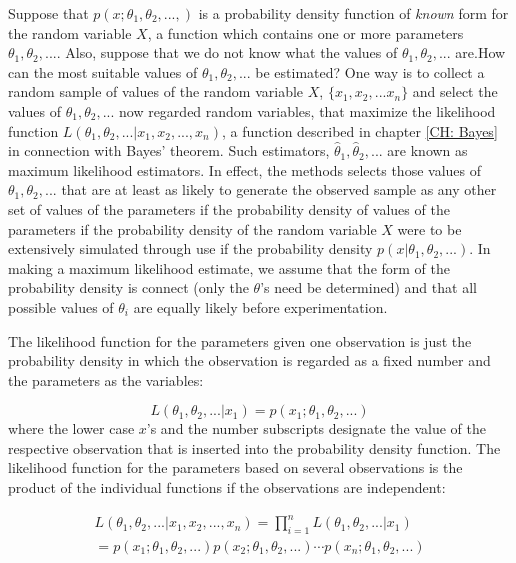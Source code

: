 \documentclass[a4paper,fleqn]{cas-dc}
\begin{document}
Suppose that $p(x; \theta_1, \theta_2,...,)$ is a probability density function of \textit{known} form for the random variable $X$, a function which contains one or more parameters $\theta_1, \theta_2,...$. Also, suppose that we do not know what the values of $\theta_1, \theta_2, ...$ are.How can the most suitable values of $\theta_1, \theta_2, ...$ be estimated? One way is to collect a random sample of values of the random variable $X$, $\{x_1,x_2,...x_n\}$ and select the values of $\theta_1, \theta_2, ...$ now regarded random variables, that maximize the likelihood function $L\left( \theta_1, \theta_2, ... | x_1,x_2,...,x_n \right)$, a function described in chapter \ref{CH: Bayes} in connection with Bayes' theorem. Such estimators, $\hat{\theta}_1,\hat{\theta}_2, ...$ are known as maximum likelihood estimators. In effect, the methods selects those values of $\theta_1, \theta_2, ...$ that are at least as likely to generate the observed sample as any other set of values of the parameters if the probability density of values of the parameters if the probability density of the random variable $X$ were to be extensively simulated through use if the probability density $p\left( x|\theta_1, \theta_2, ... \right)$. In making a maximum likelihood estimate, we assume that the form of the probability density is connect (only the $\theta$'s need be determined) and that all possible values of $\theta_i$ are equally likely before experimentation.

The likelihood function for the parameters given one observation is just the probability density in which the observation is regarded as a fixed number and the parameters as the variables:

{\footnotesize
\begin{equation}
	L\left( \theta_1, \theta_2,...|x_1 \right) = p\left( x_1; \theta_1, \theta_2, ... \right)
\end{equation} }
where the lower case $x$'s and the number subscripts designate the value of the respective observation that is inserted into the probability density function. The likelihood function for the parameters based on several observations is the product of the individual functions if the observations are independent:

{\footnotesize 
\begin{multline}
	L\left( \theta_1, \theta_2,...|x_1, x_2, ..., x_n \right) = \prod_{i=1}^{n} L\left( \theta_1, \theta_2,...|x_1 \right) \\
	= p\left( x_1; \theta_1, \theta_2, ... \right)p\left( x_2; \theta_1, \theta_2, ... \right)\cdots p\left( x_n; \theta_1, \theta_2, ... \right)
\end{multline} }
\end{document}
